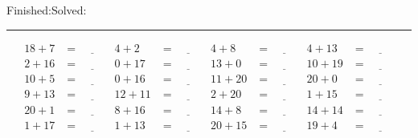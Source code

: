\documentclass{article}
\begin{document}
\begin{sloppy}
\begin{center}
{\selectfont {Started:}\underline{\hspace{1.5cm}}{Finished:}\underline{\hspace{1.5cm}}{Solved:}\underline{\hspace{1.5cm}}}
\end{center}
\hrule
\begin{align*}
    {18} + {7} &= \underline{\hspace{1cm}} & {4} + {2} &= \underline{\hspace{1cm}} & {4} + {8} &= \underline{\hspace{1cm}} & {4} + {13} &= \underline{\hspace{1cm}} \\
    {2} + {16} &= \underline{\hspace{1cm}} & {0} + {17} &= \underline{\hspace{1cm}} & {13} + {0} &= \underline{\hspace{1cm}} & {10} + {19} &= \underline{\hspace{1cm}} \\
    {10} + {5} &= \underline{\hspace{1cm}} & {0} + {16} &= \underline{\hspace{1cm}} & {11} + {20} &= \underline{\hspace{1cm}} & {20} + {0} &= \underline{\hspace{1cm}} \\
    {9} + {13} &= \underline{\hspace{1cm}} & {12} + {11} &= \underline{\hspace{1cm}} & {2} + {20} &= \underline{\hspace{1cm}} & {1} + {15} &= \underline{\hspace{1cm}} \\
    {20} + {1} &= \underline{\hspace{1cm}} & {8} + {16} &= \underline{\hspace{1cm}} & {14} + {8} &= \underline{\hspace{1cm}} & {14} + {14} &= \underline{\hspace{1cm}} \\
    {1} + {17} &= \underline{\hspace{1cm}} & {1} + {13} &= \underline{\hspace{1cm}} & {20} + {15} &= \underline{\hspace{1cm}} & {19} + {4} &= \underline{\hspace{1cm}} \\

\end{align*}
\end{sloppy}
\end{document}

